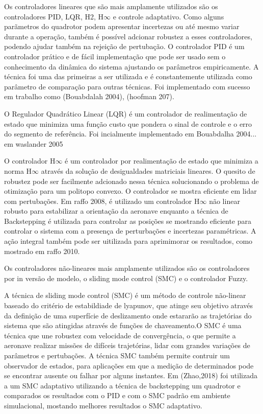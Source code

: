 Os controladores lineares que são mais amplamente utilizados são os controladores PID, LQR, H2, H$\infty$ e controle adaptativo. Como alguns parãmetros do quadrotor podem apresentar incertezas ou até mesmo variar durante a operação, também é possível adcionar robustez a esses controladores, podendo ajudar também na rejeição de pertubação. O controlador PID é um controlador prático e de fácil implementação que pode ser usado sem o conhecimento da dinâmica do sistema ajustando os parâmetros empiricamente. A técnica foi uma das primeiras a ser utilizada e é constantemente utilizada como parâmetro de comparação para outras técnicas. Foi implementado com sucesso em trabalho como (Bouabdalah 2004), (hoofman 207).

O Regulador Quadrático Linear (LQR) é um controlador de realimentação de estado que minimiza uma função custo que pondera o sinal de controle e o erro do segmento de referência. Foi incialmente implementado em Bouabdalha 2004... em waslander 2005 

O controlador H$\infty$ é um controlador por realimentação de estado que minimiza a norma H$\infty$ através da solução de desigualdades matriciais lineares. O quesito de robustez pode ser facilmente adcionado nessa técnica solucionando o problema de otimização para um politopo convexo. O controlador se mostra eficiente em lidar com pertubações. Em raffo 2008, é utilizado um controlador H$\infty$ não linear robusto para estabilizar a orientação da aeronave enquanto a técnica de Backstepping é utilizada para controlar as posições se mostrando eficiente para controlar o sistema com a presença de perturbações e incertezas paramétricas. A ação integral também pode ser uitilizada para aprimimorar os resultados, como mostrado em raffo 2010.


Os controladores não-lineares mais amplamente utilizados são os controladores por in
versão de modelo, o sliding mode control (SMC) e o controlador Fuzzy.

A técnica de sliding mode control (SMC) é um método de controle não-linear baseado do critério de estabildiade de lyapunov, que atinge seu objetivo através da definição de uma superfície de deslizamento onde estararão as trajetórias do sistema que são atingidas através de funções de chaveamento.O SMC é uma técnica que une robustez com velocidade de convergência, o que permite a aeronave realizar missões de difíceis trajetórias, lidar com grandes variações de parâmetros e pertubações. A técnica SMC também permite contruir um observador de estados, para aplicações em que a medição de determinados pode se encontrar ausente ou falhar por alguns instantes. Em (Zhao,2018) foi utilizada a um SMC adaptativo utilizando a técnica de backstepping um quadrotor e comparados os resultados com o PID e com o SMC padrão em ambiente simulacional, mostando melhores resultados o SMC adaptativo.

